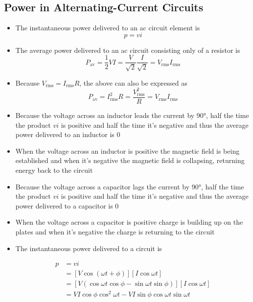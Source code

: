 \documentclass{article}
\begin{document}
\subsection{Power in Alternating-Current Circuits}

\begin{itemize}
  \item The instantaneous power delivered to an ac circuit element is \[p = vi\]

\item The average power delivered to an ac circuit consisting only of a resistor is \[P_\text{av} = \frac{1}{2} V I = \frac{V}{\sqrt{2}} \frac{I}{\sqrt{2}} = V_\text{rms} I_\text{rms}\]

  \item Because $V_\text{rms} = I_\text{rms} R$, the above can also be expressed as \[P_\text{av} = I_\text{rms}^2 R = \frac{V_\text{rms}^2}{R} = V_\text{rms} I_\text{rms}\]

  \item Because the voltage across an inductor leads the current by $\ang{90}$, half the time the product $v i$ is positive and half the time it's negative and thus the average power delivered to an inductor is $0$

  \item When the voltage across an inductor is positive the magnetic field is being established and when it's negative the magnetic field is collapsing, returning energy back to the circuit

  \item Because the voltage across a capacitor lags the current by $\ang{90}$, half the time the product $v i$ is positive and half the time it's negative and thus the average power delivered to a capacitor is $0$

  \item When the voltage across a capacitor is positive charge is building up on the plates and when it's negative the charge is returning to the circuit

  \item The instantaneous power delivered to a circuit is

        \begin{align*}
          p & = v i                                                                       \\
            & = [V \cos (\omega t + \phi)] [I \cos \omega t]                              \\
            & = [V (\cos \omega t \cos \phi - \sin \omega t \sin \phi)] [I \cos \omega t] \\
            & = V I \cos \phi \cos^2 \omega t - V I \sin \phi \cos \omega t \sin \omega t
        \end{align*}


\end{itemize}
\end{document}
